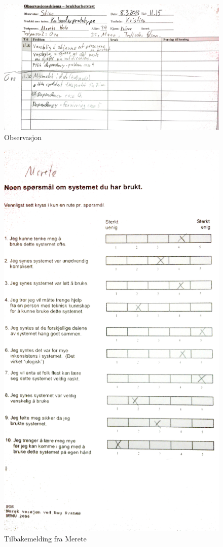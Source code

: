 \begin{figure}[obs]
\centering
\includegraphics[width=160mm]{images/observasjon.jpg}
\caption{Observasjon}
\label{overflow}
\end{figure}

\begin{figure}[mer]
\centering
\includegraphics[width=140mm]{images/tilbakemelding_merete.jpg}
\caption{Tilbakemelding fra Merete}
\label{overflow}
\end{figure}


